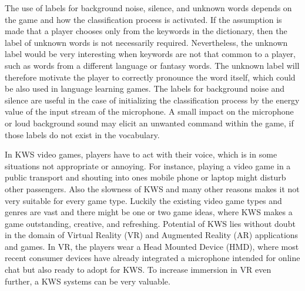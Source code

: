 The use of labels for background noise, silence, and unknown words depends on the game and how the classification process is activated.
If the assumption is made that a player chooses only from the keywords in the dictionary, then the label of unknown words is not necessarily required.
Nevertheless, the unknown label would be very interesting when keywords are not that common to a player, such as words from a different language or fantasy words.
The unknown label will therefore motivate the player to correctly pronounce the word itself, which could be also used in language learning games.
The labels for background noise and silence are useful in the case of initializing the classification process by the energy value of the input stream of the microphone.
A small impact on the microphone or loud background sound may elicit an unwanted command within the game, if those labels do not exist in the vocabulary.

In KWS video games, players have to act with their voice, which is in some situations not appropriate or annoying.
For instance, playing a video game in a public transport and shouting into ones mobile phone or laptop might disturb other passengers.
Also the slowness of KWS and many other reasons makes it not very suitable for every game type.
Luckily the existing video game types and genres are vast and there might be one or two game ideas, where KWS makes a game outstanding, creative, and refreshing.
Potential of KWS lies without doubt in the domain of Virtual Reality (VR) and Augmented Reality (AR) applications and games.
In VR, the players wear a Head Mounted Device (HMD), where most recent consumer devices have already integrated a microphone intended for online chat but also ready to adopt for KWS.
To increase immersion in VR even further, a KWS systems can be very valuable.